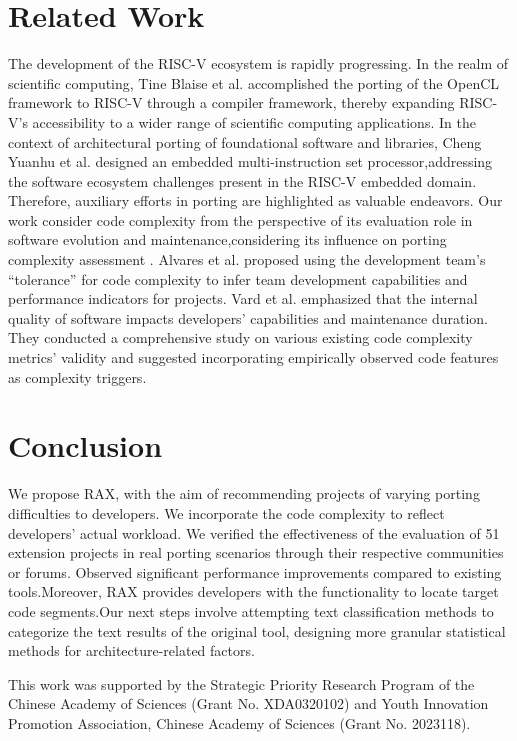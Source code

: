 \documentclass[sigconf,screen,review,anonymous]{acmart}
\begin{document}
\section{Related Work}
The development of the RISC-V ecosystem is rapidly progressing.
In the realm of scientific computing, Tine Blaise et al. \cite{osti_1830102} accomplished the porting of the OpenCL framework to RISC-V through a compiler framework, thereby expanding RISC-V's accessibility to a wider range of scientific computing applications.
In the context of architectural porting of foundational software and libraries, Cheng Yuanhu et al. \cite{2017Slow} designed an embedded multi-instruction set processor,addressing the software ecosystem challenges present in the RISC-V embedded domain.
Therefore, auxiliary efforts in porting are highlighted as valuable endeavors.
Our work consider code complexity from the perspective of its evaluation role in software evolution and maintenance,considering its influence on porting complexity assessment \cite{1993Software}.
Alvares et al. \cite{7844689} proposed using the development team's ``tolerance'' for code complexity to infer team development capabilities and performance indicators for projects.
Vard et al. \cite{2017Evaluating} emphasized that the internal quality of software impacts developers' capabilities and maintenance duration.
They conducted a comprehensive study on various existing code complexity metrics' validity and suggested incorporating empirically observed code features as complexity triggers.
\section{Conclusion}
We propose RAX, with the aim of recommending projects of varying porting difficulties to developers. We incorporate the code complexity to reflect developers' actual workload. We verified the effectiveness of the evaluation of 51 extension projects in real porting scenarios through their respective communities or forums. Observed significant performance improvements compared to existing tools.Moreover, RAX provides developers with the functionality to locate target code segments.Our next steps involve attempting text classification methods to categorize the text results of the original tool, designing more granular statistical methods for architecture-related factors.
\begin{acks}
  This work was supported by the Strategic Priority Research Program of the Chinese Academy of Sciences (Grant No. XDA0320102) and Youth Innovation Promotion Association, Chinese Academy of Sciences (Grant No. 2023118).
\end{acks}



\end{document}
